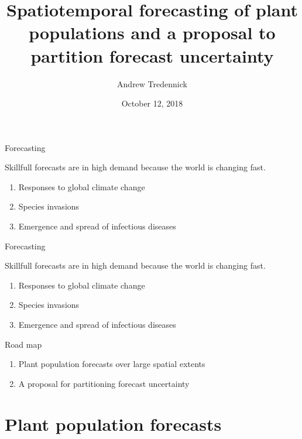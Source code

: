 \documentclass[12pt, compress, aspectratio=1610]{beamer}
\title{Spatiotemporal forecasting of plant populations and a proposal to
partition forecast uncertainty}
\subtitle{}
\date{October 12, 2018}
\author{Andrew Tredennick}
\institute{University of Georgia}
\providecommand{\tightlist}{%
  \setlength{\itemsep}{0pt}\setlength{\parskip}{0pt}}
\begin{document}
\maketitle

\begin{frame}{%
\protect\hypertarget{forecasting}{%
Forecasting}}

Skillfull forecasts are in high demand because the world is changing
fast.

\begin{enumerate}
[1.]
\tightlist
\item
  Responses to global climate change
\item
  Species invasions
\item
  Emergence and spread of infectious diseases
\end{enumerate}

\end{frame}

\begin{frame}{%
\protect\hypertarget{forecasting-1}{%
Forecasting}}

Skillfull forecasts are in high demand because the world is changing
fast.

\begin{enumerate}
[1.]
\tightlist
\item
  \alert{Responses to global climate change}
\item
  Species invasions
\item
  Emergence and spread of infectious diseases
\end{enumerate}

\end{frame}

\begin{frame}{%
\protect\hypertarget{road-map}{%
Road map}}

\begin{enumerate}
[1.]
\tightlist
\item
  Plant population forecasts over large spatial extents
\item
  A proposal for partitioning forecast uncertainty
\end{enumerate}

\end{frame}

\hypertarget{plant-population-forecasts}{%
\section{Plant population forecasts}\label{plant-population-forecasts}}
\end{document}
